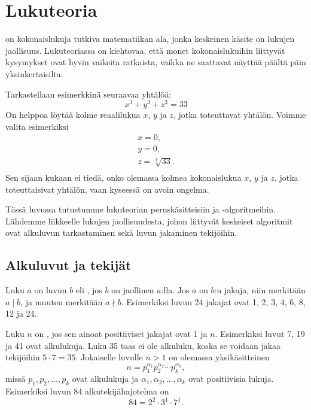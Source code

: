 \chapter{Lukuteoria}


 on kokonaislukuja tutkiva
matematiikan ala, jonka keskeinen
käsite on lukujen jaollisuus.
Lukuteoriassa on kiehtovaa, että monet kokonaislukuihin
liittyvät kysymykset ovat hyvin vaikeita ratkaista,
vaikka ne saattavat näyttää päältä päin yksinkertaisilta.

Tarkastellaan esimerkkinä seuraavaa yhtälöä:
\[x^3 + y^3 + z^3 = 33\]
On helppoa löytää kolme reaalilukua $x$, $y$ ja $z$,
jotka toteuttavat yhtälön. Voimme valita
esimerkiksi
\[
\begin{array}{lcl}
x = 0, \\
y = 0, \\
z = \sqrt[3]{33}.\\
\end{array}
\]
Sen sijaan kukaan ei tiedä, onko olemassa
kolmea kokonaislukua $x$, $y$ ja $z$,
jotka toteuttaisivat yhtälön, vaan kyseessä
on avoin ongelma.

Tässä luvussa tutustumme lukuteorian peruskäsitteisiin ja
-algoritmeihin.
Lähdemme liikkeelle lukujen jaollisuudesta,
johon liittyvät keskeiset algoritmit ovat
alkuluvun tarkastaminen sekä luvun jakaminen tekijöihin.

\section{Alkuluvut ja tekijät}


Luku $a$ on luvun $b$  eli ,
jos $b$ on jaollinen $a$:lla.
Jos $a$ on $b$:n jakaja,
niin merkitään $a \mid b$,
ja muuten merkitään $a \nmid b$.
Esimerkiksi luvun 24 jakajat ovat 1, 2, 3, 4, 6, 8, 12 ja 24.


Luku $n$ on , jos sen ainoat 
positiiviset jakajat ovat 1 ja $n$.
Esimerkiksi luvut 7, 19 ja 41 ovat alkulukuja.
Luku 35 taas ei ole alkuluku, koska se voidaan
jakaa tekijöihin $5 \cdot 7 = 35$.
Jokaiselle luvulle $n>1$ on olemassa yksikäsitteinen
\[ n = p_1^{\alpha_1} p_2^{\alpha_2} \cdots p_k^{\alpha_k},\]
missä $p_1,p_2,\ldots,p_k$ ovat alkulukuja
ja $\alpha_1,\alpha_2,\ldots,\alpha_k$ ovat positiivisia
lukuja. Esimerkiksi luvun 84 alkutekijähajotelma on
\[84 = 2^2 \cdot 3^1 \cdot 7^1.\]

